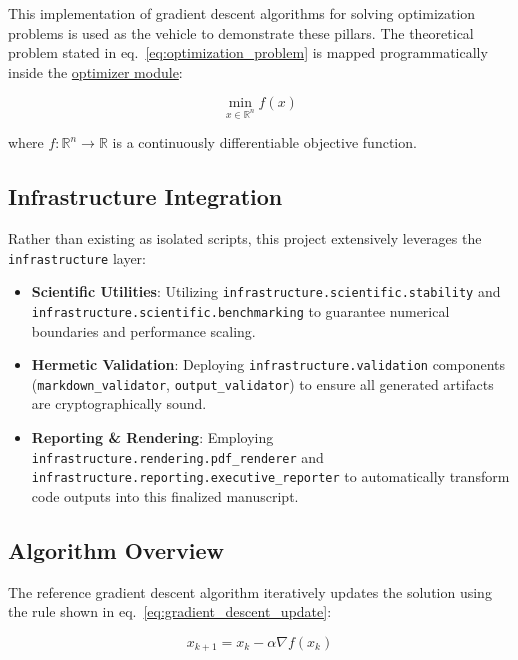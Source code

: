 \documentclass[
]{article}
\providecommand{\tightlist}{%
  \setlength{\itemsep}{0pt}\setlength{\parskip}{0pt}}
\begin{document}
This implementation of gradient descent algorithms for solving
optimization problems is used as the vehicle to demonstrate these
pillars. The theoretical problem stated in
eq.~\ref{eq:optimization_problem} is mapped programmatically inside the
\href{https://github.com/docxology/template/blob/main/projects/template_code_project/src/optimizer.py}{optimizer
module}:

\begin{equation}
\label{eq:optimization_problem}
\min_{x \in \mathbb{R}^n} f(x)
\end{equation}

where \(f: \mathbb{R}^n \rightarrow \mathbb{R}\) is a continuously
differentiable objective function.

\subsection{Infrastructure
Integration}\label{infrastructure-integration}

Rather than existing as isolated scripts, this project extensively
leverages the \texttt{infrastructure} layer:

\begin{itemize}
\tightlist
\item
  \textbf{Scientific Utilities}: Utilizing
  \texttt{infrastructure.scientific.stability} and
  \texttt{infrastructure.scientific.benchmarking} to guarantee numerical
  boundaries and performance scaling.
\item
  \textbf{Hermetic Validation}: Deploying
  \texttt{infrastructure.validation} components
  (\texttt{markdown\_validator}, \texttt{output\_validator}) to ensure
  all generated artifacts are cryptographically sound.
\item
  \textbf{Reporting \& Rendering}: Employing
  \texttt{infrastructure.rendering.pdf\_renderer} and
  \texttt{infrastructure.reporting.executive\_reporter} to automatically
  transform code outputs into this finalized manuscript.
\end{itemize}

\subsection{Algorithm Overview}\label{algorithm-overview}

The reference gradient descent algorithm iteratively updates the
solution using the rule shown in eq.~\ref{eq:gradient_descent_update}:

\begin{equation}
\label{eq:gradient_descent_update}
x_{k+1} = x_k - \alpha \nabla f(x_k)
\end{equation}
\end{document}
